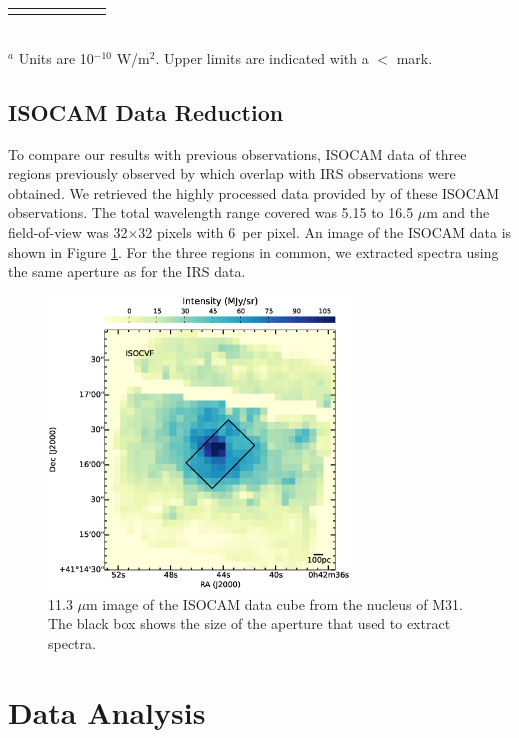 \documentclass[useAMS,usenatbib,a4paper]{mn2e}
\begin{document}
\begin{table}
\begin{minipage}{100mm}
\begin{tabular}{l c c  c  c  c  c  }
\hline
 \label{Atomic}
\end{tabular}\\
{ $^a$ Units are 10$^{-10}$ W/m$^2$. Upper limits are indicated with a $<$ mark.  }
\end{minipage}
\end{table}



\subsection{ISOCAM Data Reduction}


To compare our results with previous observations, ISOCAM data of three regions previously observed by \citet{1998Cesarsky} which overlap with IRS observations were obtained. We retrieved the highly processed data provided by \citet{Boulanger_F_2005} of these ISOCAM observations. The total wavelength range covered was 5.15 to 16.5 $\mu$m and the field-of-view was 32$\times $32 pixels with 6\arcsec\ per pixel. An image of the ISOCAM data is shown in Figure \ref{isonuc}.  For the three regions in common, we extracted spectra using the same aperture as for the IRS data. 


\begin{figure}
\centering
\includegraphics[width = 8cm]{./isonuc.eps}
\caption{11.3 $\mu$m image of the ISOCAM data cube from the nucleus of M31. The black box shows the size of the aperture that used to extract spectra.}
\label{isonuc}
\end{figure}

\section{Data Analysis}
\end{document}
